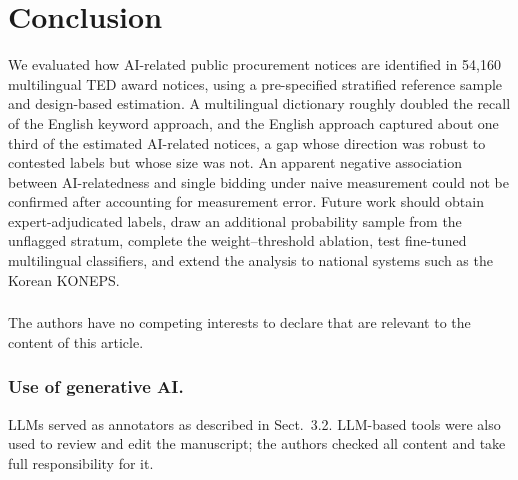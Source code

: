 \documentclass[runningheads]{llncs}
\begin{document}
\section{Conclusion}
We evaluated how AI-related public procurement notices are identified in 54,160 multilingual TED award notices, using a pre-specified stratified reference sample and design-based estimation. A multilingual dictionary roughly doubled the recall of the English keyword approach, and the English approach captured about one third of the estimated AI-related notices, a gap whose direction was robust to contested labels but whose size was not. An apparent negative association between AI-relatedness and single bidding under naive measurement could not be confirmed after accounting for measurement error. Future work should obtain expert-adjudicated labels, draw an additional probability sample from the unflagged stratum, complete the weight--threshold ablation, test fine-tuned multilingual classifiers, and extend the analysis to national systems such as the Korean KONEPS.

\begin{credits}
\subsubsection{\discintname}
The authors have no competing interests to declare that are relevant to the content of this article.
\subsubsection{Use of generative AI.} LLMs served as annotators as described in Sect.~3.2. %
LLM-based tools were also used to review and edit the manuscript; the authors checked all content and take full responsibility for it.
\end{credits}



\end{document}
